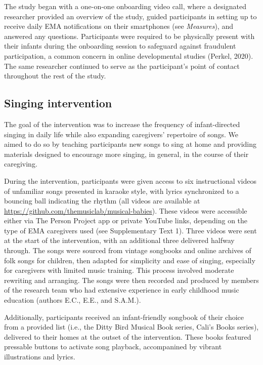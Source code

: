 \documentclass[
]{article}
\begin{document}
The study began with a one-on-one onboarding video call, where a
designated researcher provided an overview of the study, guided
participants in setting up to receive daily EMA notifications on their
smartphones (see \emph{Measures}), and answered any questions.
Participants were required to be physically present with their infants
during the onboarding session to safeguard against fraudulent
participation, a common concern in online developmental studies (Perkel,
2020). The same researcher continued to serve as the participant's point
of contact throughout the rest of the study.

\subsection{Singing intervention}\label{singing-intervention}

The goal of the intervention was to increase the frequency of
infant-directed singing in daily life while also expanding caregivers'
repertoire of songs. We aimed to do so by teaching participants new
songs to sing at home and providing materials designed to encourage more
singing, in general, in the course of their caregiving.

During the intervention, participants were given access to six
instructional videos of unfamiliar songs presented in karaoke style,
with lyrics synchronized to a bouncing ball indicating the rhythm (all
videos are available at
\url{https://github.com/themusiclab/musical-babies}). These videos were
accessible either via The Person Project app or private YouTube links,
depending on the type of EMA caregivers used (see Supplementary Text 1).
Three videos were sent at the start of the intervention, with an
additional three delivered halfway through. The songs were sourced from
vintage songbooks and online archives of folk songs for children, then
adapted for simplicity and ease of singing, especially for caregivers
with limited music training. This process involved moderate rewriting
and arranging. The songs were then recorded and produced by members of
the research team who had extensive experience in early childhood music
education (authors E.C., E.E., and S.A.M.).

Additionally, participants received an infant-friendly songbook of their
choice from a provided list (i.e., the Ditty Bird Musical Book series,
Cali's Books series), delivered to their homes at the outset of the
intervention. These books featured pressable buttons to activate song
playback, accompanined by vibrant illustrations and lyrics.
\end{document}
